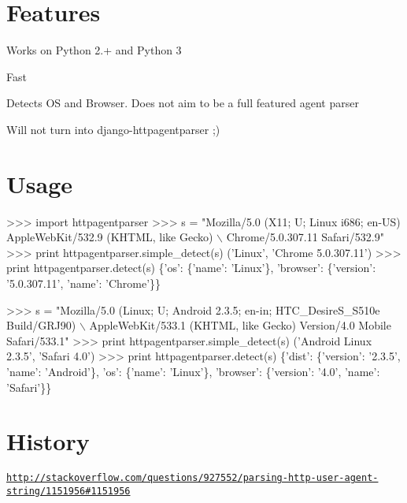 \href{https://crate.io/packages/httpagentparser/}{\tt }

\section*{Features }


\begin{DoxyItemize}
\item Works on Python 2.+ and Python 3
\item Fast
\item Detects OS and Browser. Does not aim to be a full featured agent parser
\item Will not turn into django-\/httpagentparser ;)
\end{DoxyItemize}

\section*{Usage }


\begin{DoxyCode}
>>> import httpagentparser
>>> s = "Mozilla/5.0 (X11; U; Linux i686; en-US) AppleWebKit/532.9 (KHTML, like Gecko) \(\backslash\)
        Chrome/5.0.307.11 Safari/532.9"
>>> print httpagentparser.simple\_detect(s)
('Linux', 'Chrome 5.0.307.11')
>>> print httpagentparser.detect(s)
\{'os': \{'name': 'Linux'\},
 'browser': \{'version': '5.0.307.11', 'name': 'Chrome'\}\}

>>> s = "Mozilla/5.0 (Linux; U; Android 2.3.5; en-in; HTC\_DesireS\_S510e Build/GRJ90) \(\backslash\)
        AppleWebKit/533.1 (KHTML, like Gecko) Version/4.0 Mobile Safari/533.1"
>>> print httpagentparser.simple\_detect(s)
('Android Linux 2.3.5', 'Safari 4.0')
>>> print httpagentparser.detect(s)
\{'dist': \{'version': '2.3.5', 'name': 'Android'\},
'os': \{'name': 'Linux'\},
'browser': \{'version': '4.0', 'name': 'Safari'\}\}
\end{DoxyCode}


\section*{History }

\href{http://stackoverflow.com/questions/927552/parsing-http-user-agent-string/1151956#1151956}{\tt http\+://stackoverflow.\+com/questions/927552/parsing-\/http-\/user-\/agent-\/string/1151956\#1151956} 